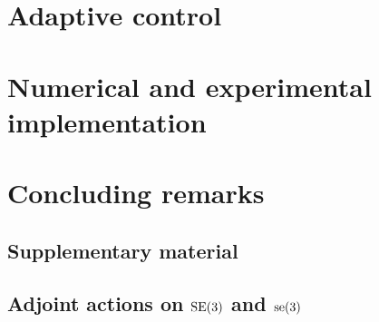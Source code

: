 \clearpage
\section{Adaptive control}
\label{sec: chap2 section header}


\clearpage
\section{Numerical and experimental implementation}
\label{sec: chap2 section header}


\section{Concluding remarks}

% 
\begin{subappendices}
\section{Supplementary material}
\subsection{Adjoint actions on $\textup{\textrm{SE}}(3)$ and $\textup{\textrm{se}}(3)$} 
\label{app:C2:adjoint}   

\end{subappendices}

